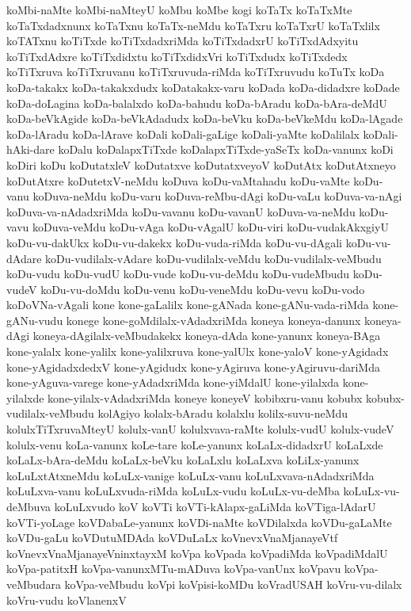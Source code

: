 {koMbi-naMte
koMbi-naMteyU
koMbu
koMbe
kogi
koTaTx
koTaTxMte
koTaTxdadxnunx
koTaTxnu
koTaTx-neMdu
koTaTxru
koTaTxrU
koTaTxlilx
koTATxnu
koTiTxde
koTiTxdadxriMda
koTiTxdadxrU
koTiTxdAdxyitu
koTiTxdAdxre
koTiTxdidxtu
koTiTxdidxVri
koTiTxdudx
koTiTxdedx
koTiTxruva
koTiTxruvanu
koTiTxruvuda-riMda
koTiTxruvudu
koTuTx
koDa
koDa-takakx
koDa-takakxdudx
koDatakakx-varu
koDada
koDa-didadxre
koDade
koDa-doLagina
koDa-balalxdo
koDa-bahudu
koDa-bAradu
koDa-bAra-deMdU
koDa-beVkAgide
koDa-beVkAdadudx
koDa-beVku
koDa-beVkeMdu
koDa-lAgade
koDa-lAradu
koDa-lArave
koDali
koDali-gaLige
koDali-yaMte
koDalilalx
koDali-hAki-dare
koDalu
koDalapxTiTxde
koDalapxTiTxde-yaSeTx
koDa-vanunx
koDi
koDiri
koDu
koDutatxleV
koDutatxve
koDutatxveyoV
koDutAtx
koDutAtxneyo
koDutAtxre
koDutetxV-neMdu
koDuva
koDu-vaMtahadu
koDu-vaMte
koDu-vanu
koDuva-neMdu
koDu-varu
koDuva-reMbu-dAgi
koDu-vaLu
koDuva-va-nAgi
koDuva-va-nAdadxriMda
koDu-vavanu
koDu-vavanU
koDuva-va-neMdu
koDu-vavu
koDuva-veMdu
koDu-vAga
koDu-vAgalU
koDu-viri
koDu-vudakAkxgiyU
koDu-vu-dakUkx
koDu-vu-dakekx
koDu-vuda-riMda
koDu-vu-dAgali
koDu-vu-dAdare
koDu-vudilalx-vAdare
koDu-vudilalx-veMdu
koDu-vudilalx-veMbudu
koDu-vudu
koDu-vudU
koDu-vude
koDu-vu-deMdu
koDu-vudeMbudu
koDu-vudeV
koDu-vu-doMdu
koDu-venu
koDu-veneMdu
koDu-vevu
koDu-vodo
koDoVNa-vAgali
kone
kone-gaLalilx
kone-gANada
kone-gANu-vada-riMda
kone-gANu-vudu
konege
kone-goMdilalx-vAdadxriMda
koneya
koneya-danunx
koneya-dAgi
koneya-dAgilalx-veMbudakekx
koneya-dAda
kone-yanunx
koneya-BAga
kone-yalalx
kone-yalilx
kone-yalilxruva
kone-yalUlx
kone-yaloV
kone-yAgidadx
kone-yAgidadxdedxV
kone-yAgidudx
kone-yAgiruva
kone-yAgiruvu-dariMda
kone-yAguva-varege
kone-yAdadxriMda
kone-yiMdalU
kone-yilalxda
kone-yilalxde
kone-yilalx-vAdadxriMda
koneye
koneyeV
kobibxru-vanu
kobubx
kobubx-vudilalx-veMbudu
kolAgiyo
kolalx-bAradu
kolalxlu
kolilx-suvu-neMdu
kolulxTiTxruvaMteyU
kolulx-vanU
kolulxvava-raMte
kolulx-vudU
kolulx-vudeV
kolulx-venu
koLa-vanunx
koLe-tare
koLe-yanunx
koLaLx-didadxrU
koLaLxde
koLaLx-bAra-deMdu
koLaLx-beVku
koLaLxlu
koLaLxva
koLiLx-yanunx
koLuLxtAtxneMdu
koLuLx-vanige
koLuLx-vanu
koLuLxvava-nAdadxriMda
koLuLxva-vanu
koLuLxvuda-riMda
koLuLx-vudu
koLuLx-vu-deMba
koLuLx-vu-deMbuva
koLuLxvudo
koV
koVTi
koVTi-kAlapx-gaLiMda
koVTiga-lAdarU
koVTi-yoLage
koVDabaLe-yanunx
koVDi-naMte
koVDilalxda
koVDu-gaLaMte
koVDu-gaLu
koVDutuMDAda
koVDuLaLx
koVnevxVnaMjanayeVtf
koVnevxVnaMjanayeVninxtayxM
koVpa
koVpada
koVpadiMda
koVpadiMdalU
koVpa-patitxH
koVpa-vanunxMTu-mADuva
koVpa-vanUnx
koVpavu
koVpa-veMbudara
koVpa-veMbudu
koVpi
koVpisi-koMDu
koVradUSAH
koVru-vu-dilalx
koVru-vudu
koVlanenxV
}
